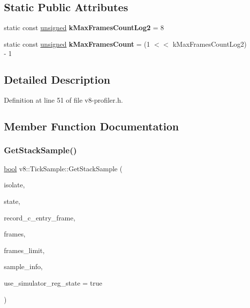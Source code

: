 \subsection*{Static Public Attributes}
\begin{DoxyCompactItemize}
\item 
\mbox{\label{structv8_1_1TickSample_a74b64cf598134b781b4ae1c65c31a70a}} 
static const \mbox{\hyperlink{classunsigned}{unsigned}} {\bfseries k\+Max\+Frames\+Count\+Log2} = 8
\item 
\mbox{\label{structv8_1_1TickSample_a7f1b6ed32cd88d137e70d99adaa37d64}} 
static const \mbox{\hyperlink{classunsigned}{unsigned}} {\bfseries k\+Max\+Frames\+Count} = (1 $<$$<$ k\+Max\+Frames\+Count\+Log2) -\/ 1
\end{DoxyCompactItemize}


\subsection{Detailed Description}


Definition at line 51 of file v8-\/profiler.\+h.



\subsection{Member Function Documentation}
\mbox{\label{structv8_1_1TickSample_a4cf2b58bf6ef55494723cceb35f8cc9b}} 
\subsubsection{\texorpdfstring{Get\+Stack\+Sample()}{GetStackSample()}}
{\footnotesize\ttfamily \mbox{\hyperlink{classbool}{bool}} v8\+::\+Tick\+Sample\+::\+Get\+Stack\+Sample (\begin{DoxyParamCaption}\item[{Isolate $\ast$}]{isolate,  }\item[{\mbox{\hyperlink{structv8_1_1RegisterState}{v8\+::\+Register\+State}} $\ast$}]{state,  }\item[{Record\+C\+Entry\+Frame}]{record\+\_\+c\+\_\+entry\+\_\+frame,  }\item[{void $\ast$$\ast$}]{frames,  }\item[{\mbox{\hyperlink{classsize__t}{size\+\_\+t}}}]{frames\+\_\+limit,  }\item[{\mbox{\hyperlink{structv8_1_1SampleInfo}{v8\+::\+Sample\+Info}} $\ast$}]{sample\+\_\+info,  }\item[{\mbox{\hyperlink{classbool}{bool}}}]{use\+\_\+simulator\+\_\+reg\+\_\+state = {\ttfamily true} }\end{DoxyParamCaption})\hspace{0.3cm}{\ttfamily [static]}}

